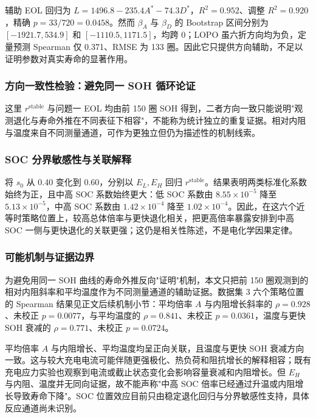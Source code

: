 \documentclass[withoutpreface]{cumcmthesis}
\begin{document}
辅助 EOL 回归为 $L=1496.8-235.4A^*-74.3D^*$，$R^2=0.952$、调整 $R^2=0.920$，精确 $p=33/720=0.0458$。然而 $\beta_A$ 与 $\beta_D$ 的 Bootstrap 区间分别为 $[-1921.7,534.9]$ 和 $[-1110.5,1171.5]$，均跨 0；LOPO 虽六折方向均为负，定量预测 Spearman 仅 0.371、RMSE 为 133 圈。因此它只提供方向辅助，不足以证明参数对真实寿命的显著作用。

\subsubsection{方向一致性检验：避免同一 SOH 循环论证}

这里 $r^{\mathrm{stable}}$ 与问题一 EOL 均由前 150 圈 SOH 得到，二者方向一致只能说明"观测退化与寿命外推在不同表征下相容"，不能称为统计独立的重复证据。相对内阻与温度来自不同测量通道，可作为更独立但仍为描述性的机制线索。

\subsubsection{SOC 分界敏感性与关联解释}

将 $s_0$ 从 0.40 变化到 0.60，分别以 $E_L,E_H$ 回归 $r^{\mathrm{stable}}$。结果表明两类标准化系数始终为正，且中高 SOC 系数始终更大：低 SOC 系数由 $8.55\times10^{-5}$ 降至 $5.13\times10^{-5}$，中高 SOC 系数由 $1.42\times10^{-4}$ 降至 $1.02\times10^{-4}$。因此，在这六个近等时策略位置上，较高总体倍率与更快退化相关，把更高倍率暴露安排到中高 SOC 一侧与更快退化的关联更强；这仍是相关性陈述，不是电化学因果定律。

\subsubsection{可能机制与证据边界}

为避免用同一 SOH 曲线的寿命外推反向"证明"机制，本文只把前 150 圈观测到的相对内阻斜率和平均温度作为不同测量通道的辅助证据。数据集 3 六个策略位置的 Spearman 结果见正文后续机制小节：平均倍率 $A$ 与内阻增长斜率的 $\rho=0.928$、未校正 $p=0.0077$，与平均温度的 $\rho=0.841$、未校正 $p=0.0361$，温度与更快 SOH 衰减的 $\rho=0.771$、未校正 $p=0.0724$。

平均倍率 $A$ 与内阻增长、平均温度均呈正向关联，且温度与更快 SOH 衰减方向一致。这与较大充电电流可能伴随更强极化、热负荷和阻抗增长的解释相容；既有充电应力实验也观察到电流或截止状态变化会影响容量衰减和内阻增长\cite{gao2017}。但 $E_H$ 与内阻、温度并无同向证据，故不能声称"中高 SOC 倍率已经通过升温或内阻增长导致寿命下降"。SOC 位置效应目前只由稳定退化回归与分界敏感性支持，具体反应通道尚未识别。
\end{document}
